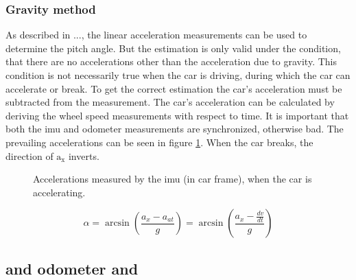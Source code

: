 \subsubsection{Gravity method}
As described in ..., the linear acceleration measurements can be used to determine the pitch angle.
But the estimation is only valid under the condition, that there are no accelerations other than the acceleration due to gravity.
This condition is not necessarily true when the car is driving, during which the car can accelerate or break.
To get the correct estimation the car's acceleration must be subtracted from the measurement.
The car's acceleration can be calculated by deriving the wheel speed measurements with respect to time.
It is important that both the \gls{imu} and odometer measurements are synchronized, otherwise bad.
The prevailing accelerations can be seen in figure \ref{fig:tikz_car_gravity}.
When the car breaks, the direction of $\mathrm{a}_\mathrm{x}$ inverts.
\begin{figure}[htpb]
    \centering
    
    \caption{Accelerations measured by the \acrshort{imu} (in car frame), when the car is accelerating.}
    \label{fig:tikz_car_gravity}
\end{figure}
\begin{equation}
    \alpha = \arcsin\left(\frac{a_x-a_{at}}{g}\right)
    = \arcsin\left(\frac{a_x-\frac{dv}{dt}}{g}\right)
\end{equation}


\subsection{ and odometer and }
